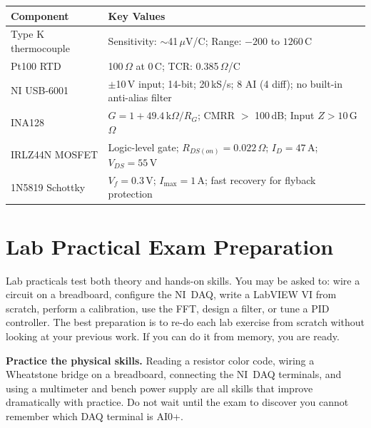 \documentclass[11pt,letterpaper]{article}
\begin{document}
\begin{faqbox}
\small
\begin{tabularx}{\textwidth}{@{} l X @{}}
\toprule
\textbf{Component} & \textbf{Key Values} \\
\midrule
Type K thermocouple & Sensitivity: $\sim$41\,$\mu$V/\textdegree{}C; Range: $-200$ to $1260$\,\textdegree{}C \\
Pt100 RTD & 100\,$\Omega$ at 0\,\textdegree{}C; TCR: 0.385\,$\Omega$/\textdegree{}C \\
NI USB-6001 & $\pm$10\,V input; 14-bit; 20\,kS/s; 8 AI (4 diff); no built-in anti-alias filter \\
INA128 & $G = 1 + 49.4\,\text{k}\Omega/R_G$; CMRR $>$ 100\,dB; Input $Z > 10$\,G$\Omega$ \\
IRLZ44N MOSFET & Logic-level gate; $R_{DS(on)} = 0.022\,\Omega$; $I_D = 47$\,A; $V_{DS} = 55$\,V \\
1N5819 Schottky & $V_f = 0.3$\,V; $I_{\max} = 1$\,A; fast recovery for flyback protection \\
\bottomrule
\end{tabularx}
\end{faqbox}

\section{Lab Practical Exam Preparation}

\begin{faqbox}
Lab practicals test both theory and hands-on skills. You may be asked to: wire a circuit on a breadboard, configure the NI~DAQ, write a LabVIEW VI from scratch, perform a calibration, use the FFT, design a filter, or tune a PID controller. The best preparation is to re-do each lab exercise from scratch without looking at your previous work. If you can do it from memory, you are ready.
\end{faqbox}

\begin{tipbox}
\textbf{Practice the physical skills.} Reading a resistor color code, wiring a Wheatstone bridge on a breadboard, connecting the NI~DAQ terminals, and using a multimeter and bench power supply are all skills that improve dramatically with practice. Do not wait until the exam to discover you cannot remember which DAQ terminal is AI0+.
\end{tipbox}
\end{document}
